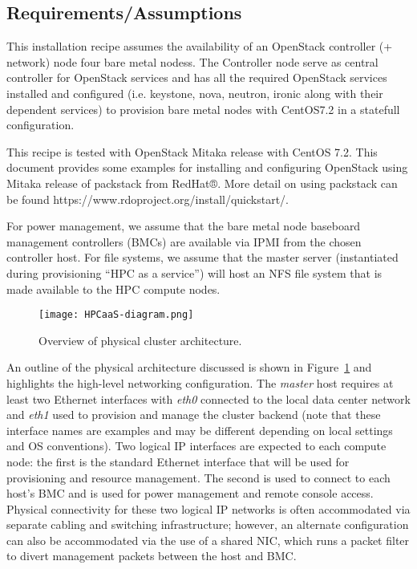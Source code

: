\subsection{Requirements/Assumptions}

This installation recipe assumes the availability of an OpenStack controller 
(+ network) node four bare metal nodess. The Controller node serve as central 
controller for OpenStack services and has all the required OpenStack services 
installed and configured (i.e. keystone, nova, neutron, ironic along with their 
dependent services) to provision bare metal nodes with CentOS7.2 in a statefull 
configuration. 

This recipe is tested with OpenStack Mitaka release with CentOS 7.2. This 
document provides some examples for installing and configuring OpenStack using 
Mitaka release of packstack from RedHat®. More detail on using packstack can be 
found https://www.rdoproject.org/install/quickstart/. 

For power management, we assume that the bare metal node baseboard management 
controllers (BMCs) are available via IPMI from the chosen controller host. For 
file systems, we assume that the master server (instantiated during provisioning 
“HPC as a service”) will host an NFS file system that is made available to the 
HPC compute nodes.



\begin{figure}[hbt]
\center
\texttt{[image: HPCaaS-diagram.png]}
\vspace*{-0.2cm}
\caption{Overview of physical cluster architecture.} \label{fig:physical_arch}
\end{figure}
\mbox{}

\vspace*{0.5cm}

An outline of the physical architecture discussed is shown in
Figure~\ref{fig:physical_arch} and highlights the high-level networking
configuration. The {\em master} host requires at least two Ethernet interfaces
with {\em eth0} connected to the local data center network and {\em eth1} used
to provision and manage the cluster backend (note that these interface names
are examples and may be different depending on local settings and OS
conventions). Two logical IP interfaces are expected to each compute node: the
first is the standard Ethernet interface that will be used for provisioning and
resource management. The second is used to connect to each host's BMC and is
used for power management and remote console access. Physical connectivity for
these two logical IP networks is often accommodated via separate cabling and
switching infrastructure; however, an alternate configuration can also be
accommodated via the use of a shared NIC, which runs a packet filter to divert
management packets between the host and BMC.

